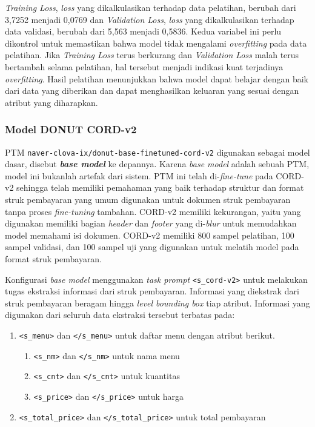 \emph{Training Loss}, \emph{loss} yang dikalkulasikan terhadap data pelatihan, berubah dari 3,7252 menjadi 0,0769 dan \emph{Validation Loss}, \emph{loss} yang dikalkulasikan terhadap data validasi, berubah dari 5,563 menjadi 0,5836. Kedua variabel ini perlu dikontrol untuk memastikan bahwa model tidak mengalami \emph{overfitting} pada data pelatihan. Jika \emph{Training Loss} terus berkurang dan \emph{Validation Loss} malah terus bertambah selama pelatihan, hal tersebut menjadi indikasi kuat terjadinya \emph{overfitting}. Hasil pelatihan menunjukkan bahwa model dapat belajar dengan baik dari data yang diberikan dan dapat menghasilkan keluaran yang sesuai dengan atribut yang diharapkan.

\subsubsection{Model DONUT CORD-v2}
\label{subsubsec:model-base}

PTM \donut{} \texttt{naver-clova-ix/donut-base-finetuned-cord-v2} digunakan sebagai model dasar, disebut \textbf{\emph{base model}} ke depannya. Karena \emph{base model} adalah sebuah PTM, model ini bukanlah artefak dari sistem. PTM ini telah di-\emph{fine-tune} pada \dataset{} CORD-v2 sehingga telah memiliki pemahaman yang baik terhadap struktur dan format struk pembayaran yang umum digunakan untuk dokumen struk pembayaran tanpa proses \emph{fine-tuning} tambahan. \datasetfl{} CORD-v2 memiliki kekurangan, yaitu \dataset{} yang digunakan memiliki bagian \emph{header} dan \emph{footer} yang di-\emph{blur} untuk memudahkan model memahami isi dokumen. \datasetfl{} CORD-v2 memiliki 800 sampel pelatihan, 100 sampel validasi, dan 100 sampel uji yang digunakan untuk melatih model \donut{} pada format struk pembayaran.

Konfigurasi \emph{base model} menggunakan \emph{task prompt} \texttt{<s\_cord-v2>} untuk melakukan tugas ekstraksi informasi dari struk pembayaran. Informasi yang diekstrak dari struk pembayaran beragam hingga \emph{level bounding box} tiap atribut. Informasi yang digunakan dari seluruh data ekstraksi tersebut terbatas pada:
\begin{enumerate}
    \item \texttt{<s\_menu>} dan \texttt{</s\_menu>} untuk daftar menu dengan atribut berikut.
    \begin{enumerate}
        \item \texttt{<s\_nm>} dan \texttt{</s\_nm>} untuk nama menu
        \item \texttt{<s\_cnt>} dan \texttt{</s\_cnt>} untuk kuantitas
        \item \texttt{<s\_price>} dan \texttt{</s\_price>} untuk harga
    \end{enumerate}
    \item \texttt{<s\_total\_price>} dan \texttt{</s\_total\_price>} untuk total pembayaran
\end{enumerate}

